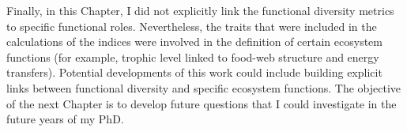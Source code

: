 Finally, in this Chapter, I did not explicitly link the functional diversity metrics to specific functional roles. Nevertheless, the traits that were included in the calculations of the indices were involved in the definition of certain ecosystem functions (for example, trophic level linked to food-web structure and energy transfers). Potential developments of this work could include building explicit links between functional diversity and specific ecosystem functions. The objective of the next Chapter is to develop future questions that I could investigate in the future years of my PhD.



